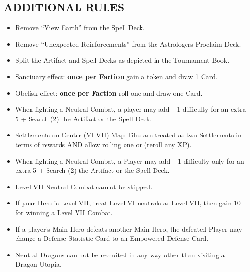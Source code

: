 \begin{multicols*}{2}
\subsection*{\MakeUppercase{Additional Rules}}
\begin{itemize}
  \item Remove ``View Earth'' from the Spell Deck.
  \item Remove ``Unexpected Reinforcements'' from the Astrologers Proclaim Deck.
  \item Split the Artifact and Spell Decks as depicted in the Tournament Book. %
  \item Sanctuary effect: \textbf{once per Faction} gain a  token and draw 1 Card.
  \item Obelisk effect: \textbf{once per Faction} roll one  and draw one Card.
  \item When fighting a Neutral Combat, a player may add +1 difficulty for an extra 5  + Search (2) the Artifact or the Spell Deck.
  \item Settlements on Center (VI-VII) Map Tiles are treated as two Settlements in terms of rewards AND allow rolling one  or  (reroll any XP).  
  \item When fighting a Neutral Combat, a Player may add +1 difficulty only for an extra 5  + Search (2) the Artifact or the Spell Deck. %
  \item Level VII Neutral Combat cannot be skipped.
  \item If your Hero is Level VII, treat Level VI neutrals as Level VII, then gain 10  for winning a Level VII Combat. %
  \item If a player's Main Hero defeats another Main Hero, the defeated Player may change a Defense Statistic Card to an Empowered Defense Card. %
  \item Neutral Dragons can not be recruited in any way other than visiting a Dragon Utopia.
  

\end{itemize}
\end{multicols*}
